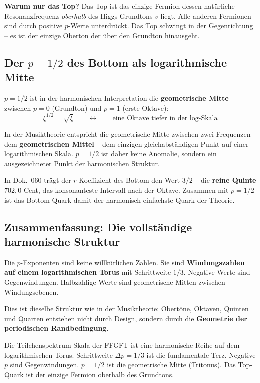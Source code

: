 \textbf{Warum nur das Top?} Das Top ist das einzige Fermion dessen
natürliche Resonanzfrequenz \emph{oberhalb} des Higgs-Grundtons $v$
liegt. Alle anderen Fermionen sind durch positive $p$-Werte unterdrückt.
Das Top schwingt in der Gegenrichtung -- es ist der einzige Oberton
der über den Grundton hinausgeht.

\subsection{Der $p = 1/2$ des Bottom als logarithmische Mitte}

$p = 1/2$ ist in der harmonischen Interpretation die
\textbf{geometrische Mitte} zwischen $p = 0$ (Grundton) und $p = 1$
(erste Oktave):
\begin{equation}
    \xi^{1/2} = \sqrt{\xi} \qquad \longleftrightarrow \qquad
    \text{eine Oktave tiefer in der log-Skala}
\end{equation}

In der Musiktheorie entspricht die geometrische Mitte zwischen zwei
Frequenzen dem \textbf{geometrischen Mittel} -- dem einzigen
gleichabständigen Punkt auf einer logarithmischen Skala. $p = 1/2$
ist daher keine Anomalie, sondern ein ausgezeichneter Punkt der
harmonischen Struktur.

In Dok.~060 trägt der $r$-Koeffizient des Bottom den Wert $3/2$ --
die \textbf{reine Quinte} $702{,}0$ Cent, das konsonanteste
Intervall nach der Oktave. Zusammen mit $p = 1/2$ ist das Bottom-Quark
damit der harmonisch einfachste Quark der Theorie.

\subsection{Zusammenfassung: Die vollständige harmonische Struktur}

Die $p$-Exponenten sind keine willkürlichen Zahlen. Sie sind
\textbf{Windungszahlen auf einem logarithmischen Torus} mit
Schrittweite $1/3$. Negative Werte sind Gegenwindungen.
Halbzahlige Werte sind geometrische Mitten zwischen Windungsebenen.

Dies ist dieselbe Struktur wie in der Musiktheorie: Obertöne,
Oktaven, Quinten und Quarten entstehen nicht durch Design, sondern
durch die \textbf{Geometrie der periodischen Randbedingung}.

\begin{predbox}
Die Teilchenspektrum-Skala der FFGFT ist eine harmonische Reihe auf
dem logarithmischen Torus. Schrittweite $\Delta p = 1/3$ ist die
fundamentale Terz. Negative $p$ sind Gegenwindungen. $p = 1/2$ ist
die geometrische Mitte (Tritonus). Das Top-Quark ist der einzige
Fermion oberhalb des Grundtons.
\end{predbox}

